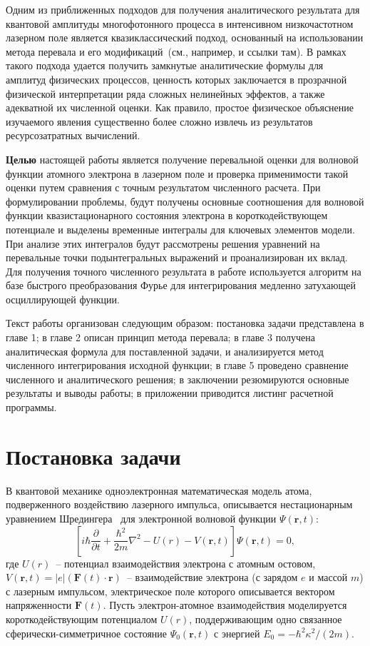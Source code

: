 \documentclass[14pt, a4paper]{article}
\numberwithin{figure}{section}
\numberwithin{equation}{section}
\newcommand{\sectionbreak}{\clearpage}
\newcommand{\vF}{\mathbf{F}}
\newcommand{\vr}{\mathbf{r}}
\begin{document}
Одним из приближенных подходов для получения аналитического результата для квантовой амплитуды многофотонного процесса в интенсивном низкочастотном лазерном поле является квазиклассический подход, основанный на использовании метода перевала и его модификаций~(см., например, \cite{FFMSZPRA13,main} и ссылки там). В рамках такого подхода удается получить замкнутые аналитические формулы для амплитуд физических процессов, ценность которых заключается в прозрачной физической интерпретации ряда сложных нелинейных эффектов, а также адекватной их численной оценки. Как правило, простое физическое объяснение изучаемого явления существенно более сложно извлечь из результатов ресурсозатратных вычислений.

\textbf{Целью} настоящей работы является получение перевальной оценки для волновой функции атомного электрона в лазерном поле и проверка применимости такой оценки путем сравнения с точным результатом численного расчета. При формулировании проблемы, будут получены основные соотношения для волновой функции квазистационарного состояния электрона в короткодействующем потенциале и выделены временные интегралы для ключевых элементов модели. При анализе этих интегралов будут рассмотрены решения уравнений на перевальные точки подынтегральных выражений и проанализирован их вклад. Для получения точного численного результата в работе используется алгоритм на базе быстрого преобразования Фурье для интегрирования медленно затухающей осциллирующей функции.

Текст работы организован следующим образом: постановка задачи представлена в главе 1; в главе 2 описан принцип метода перевала; в главе 3 получена аналитическая формула для поставленной задачи, и анализируется метод численного интегрирования исходной функции; в главе 5 проведено сравнение численного и аналитического решения; в заключении резюмируются основные результаты и выводы работы; в приложении приводится листинг расчетной программы.
\sectionbreak


\section{Постановка задачи}

В квантовой механике одноэлектронная математическая модель атома, подверженного воздействию
лазерного импульса, описывается нестационарным уравнением Шредингера~\cite{LL} для электронной волновой функции $\Psi(\vr,t)$:
\begin{equation}
\label{TDSE}
\left[i\hbar\frac{\partial}{\partial t} + \frac{\hbar^2}{2m}\nabla^2 - U(r) - V(\vr,t)\right]\Psi(\vr,t) = 0,
\end{equation}
где $U(r)$~-- потенциал взаимодействия электрона с атомным остовом, $V(\vr,t)=|e|(\vF(t)\cdot\vr)$~-- взаимодействие электрона (с зарядом $e$ и массой $m$) с лазерным импульсом, электрическое поле которого описывается вектором напряженности $\vF(t)$. Пусть электрон-атомное взаимодействия моделируется короткодействующим потенциалом $U(r)$, поддерживающим одно связанное сферически-симметричное состояние $\Psi_0(\vr,t)$ с энергией $E_0=-\hbar^2\kappa^2/(2m)$.
\end{document}
